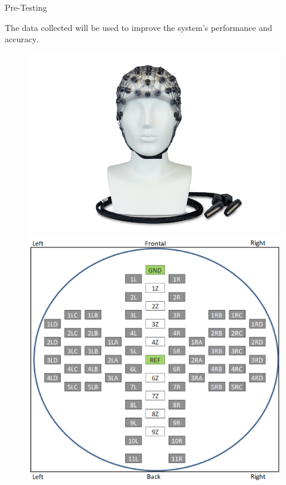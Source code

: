 \begin{frame}{Pre-Testing}
\begin{minipage}[c]{.69\textwidth}
        \vspace*{.5cm}
        The data collected will be used to improve the system's performance and accuracy.
    \end{minipage}
    \begin{minipage}[c]{.3\textwidth}
    \begin{figure}
        \centering
        \includegraphics[width=\textwidth]{figures/results/EEG_CAP}
        \includegraphics[width=.65\textwidth]{figures/results/CAP_Layout}
    \end{figure}
    \end{minipage}
\end{frame}

% 
% 
